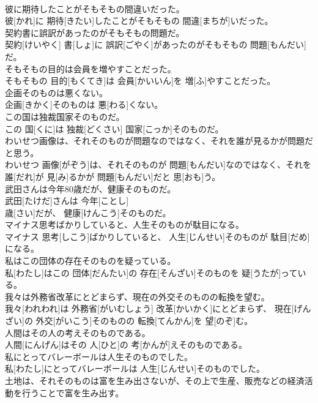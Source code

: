 \documentclass[8pt]{extreport}
\begin{document}
\begin{CJK}{UTF8}{min}
\\	彼に期待したことがそもそもの間違いだった。	
\\	彼[かれ]に 期待[きたい]したことがそもそもの 間違[まちが]いだった。
\\	契約書に誤訳があったのがそもそもの問題だ。	
\\	契約[けいやく] 書[しょ]に 誤訳[ごやく]があったのがそもそもの 問題[もんだい]だ。
\\	そもそもの目的は会員を増やすことだった。	
\\	そもそもの 目的[もくてき]は 会員[かいいん]を 増[ふ]やすことだった。
\\	企画そのものは悪くない。	
\\	企画[きかく]そのものは 悪[わる]くない。
\\	この国は独裁国家そのものだ。	
\\	この 国[くに]は 独裁[どくさい] 国家[こっか]そのものだ。
\\	わいせつ画像は、それそのものが問題なのではなく、それを誰が見るかが問題だと思う。	
\\	わいせつ 画像[がぞう]は、それそのものが 問題[もんだい]なのではなく、それを 誰[だれ]が 見[み]るかが 問題[もんだい]だと 思[おも]う。
\\	武田さんは今年80歳だが、健康そのものだ。	
\\	武田[たけだ]さんは 今年[ことし] 
\\	歳[さい]だが、 健康[けんこう]そのものだ。
\\	マイナス思考ばかりしていると、人生そのものが駄目になる。	
\\	マイナス 思考[しこう]ばかりしていると、 人生[じんせい]そのものが 駄目[だめ]になる。
\\	私はこの団体の存在そのものを疑っている。	
\\	私[わたし]はこの 団体[だんたい]の 存在[そんざい]そのものを 疑[うたが]っている。
\\	我々は外務省改革にとどまらず、現在の外交そのものの転換を望む。	
\\	我々[われわれ]は 外務省[がいむしょう] 改革[かいかく]にとどまらず、 現在[げんざい]の 外交[がいこう]そのものの 転換[てんかん]を 望[のぞ]む。
\\	人間はその人の考えそのものである。	
\\	人間[にんげん]はその 人[ひと]の 考[かんが]えそのものである。
\\	私にとってバレーボールは人生そのものでした。	
\\	私[わたし]にとってバレーボールは 人生[じんせい]そのものでした。
\\	土地は、それそのものは富を生み出さないが、その上で生産、販売などの経済活動を行うことで富を生み出す。	

\end{CJK}
\end{document}
